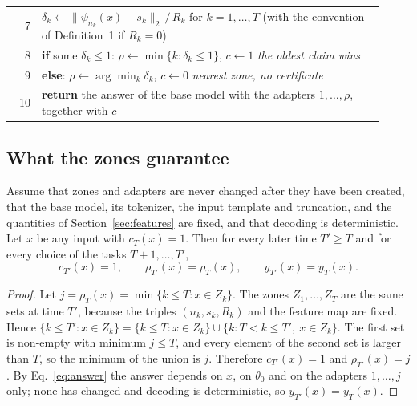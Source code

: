\begin{algorithm}
\begin{tabular}{@{}r@{\hspace{0.8em}}p{0.92\linewidth}@{}}
    7 & $\delta_k \leftarrow \lVert \psi_{n_k}(x) - s_k \rVert_2 \,/\, R_k$ \quad for $k = 1, \dots, T$ \quad (with the convention of Definition~1 if $R_k = 0$) \\
    8 & \textbf{if} some $\delta_k \le 1$: \quad $\rho \leftarrow \min\{k : \delta_k \le 1\}$, \quad $c \leftarrow 1$
        \hfill \emph{the oldest claim wins} \\
    9 & \textbf{else}: \quad $\rho \leftarrow \arg\min_k \delta_k$, \quad $c \leftarrow 0$
        \hfill \emph{nearest zone, no certificate} \\
    10 & \textbf{return} the answer of the base model with the adapters $1, \dots, \rho$, together with $c$ \\
  \end{tabular}
\end{algorithm}

\subsection{What the zones guarantee}
\label{sec:guarantee}

\begin{theorem}
\label{thm:writeonce}
Assume that zones and adapters are never changed after they have been created, that the base model, its tokenizer, the input template and truncation, and the quantities of Section~\ref{sec:features} are fixed, and that decoding is deterministic. Let
$x$ be any input with $c_T(x) = 1$. Then for every later time $T' \ge T$ and for every choice of the
tasks $T+1, \dots, T'$,
\[
  c_{T'}(x) = 1, \qquad \rho_{T'}(x) = \rho_T(x), \qquad y_{T'}(x) = y_T(x) .
\]
\end{theorem}

\begin{proof}
Let $j = \rho_T(x) = \min\{k \le T : x \in Z_k\}$. The zones $Z_1, \dots, Z_T$ are the same sets at
time $T'$, because the triples $(n_k, s_k, R_k)$ and the feature map are fixed. Hence
$\{k \le T' : x \in Z_k\} = \{k \le T : x \in Z_k\} \cup \{k : T < k \le T',\ x \in Z_k\}$. The first
set is non-empty with minimum $j \le T$, and every element of the second set is larger than $T$, so
the minimum of the union is $j$. Therefore $c_{T'}(x) = 1$ and $\rho_{T'}(x) = j$. By
Eq.~\eqref{eq:answer} the answer depends on $x$, on $\theta_0$ and on the adapters $1, \dots, j$
only; none has changed and decoding is deterministic, so $y_{T'}(x) = y_T(x)$.
\end{proof}

